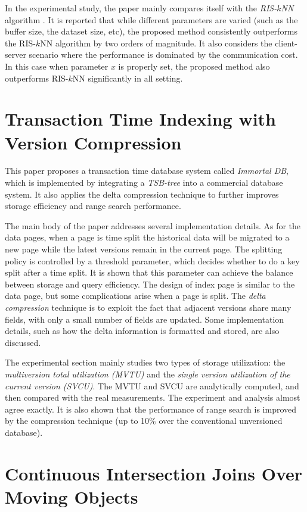 \documentclass[paper=a4, fontsize=18pt]{article} %
\numberwithin{equation}{section} %
\numberwithin{figure}{section} %
\numberwithin{table}{section} %
\begin{document}
In the experimental study, the paper mainly compares itself with the \emph{RIS-$k$NN} algorithm \cite{ZZPTL03}. It is reported that while different parameters are varied (such as the buffer size, the dataset size, etc), the proposed method consistently outperforms the RIS-$k$NN algorithm by two orders of magnitude. It also considers the client-server scenario where the performance is dominated by the communication cost. In this case when parameter $x$ is properly set, the proposed method also outperforms RIS-$k$NN significantly in all setting.

\section{Transaction Time Indexing with Version Compression \cite{LHNZ08}}

This paper proposes a transaction time database system called \emph{Immortal DB}, which is implemented by integrating a \emph{TSB-tree} \cite{LS89} into a commercial database system. It also applies the delta compression technique to further improves storage efficiency and range search performance.

The main body of the paper addresses several implementation details. As for the data pages, when a page is time split the historical data will be migrated to a new page while the latest versions remain in the current page. The splitting policy is controlled by a threshold parameter, which decides whether to do a key split after a time split. It is shown that this parameter can achieve the balance between storage and query efficiency. The design of index page is similar to the data page, but some complications arise when a page is split. The \emph{delta compression} technique is to exploit the fact that adjacent versions share many fields, with only a small number of fields are updated. Some implementation details, such as how the delta information is formatted and stored, are also discussed.

The experimental section mainly studies two types of storage utilization: the \emph{multiversion total utilization (MVTU)} and the \emph{single version utilization of the current version (SVCU)}. The MVTU and SVCU are analytically computed, and then compared with the real measurements. The experiment and analysis almost agree exactly. It is also shown that the performance of range search is improved by the compression technique (up to 10\% over the conventional unversioned database).


\section{Continuous Intersection Joins Over Moving Objects \cite{ZLRB08}}
\end{document}
